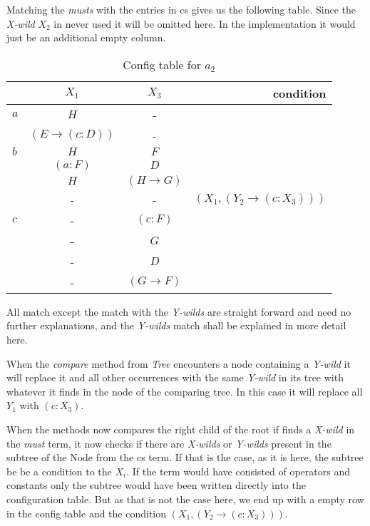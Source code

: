 Matching the \emph{musts} with the entries in cs gives us the following table. Since the \emph{X-wild} $X_2$ in never used it will be omitted here. In the implementation it would just be an additional empty column.

\begin{table}[H]
\centering
\begin{tabular}{l c c r}
		& $X_1$ & $X_3$ & condition \\
	\hline 
	$a$	& $H$ & - &  \\
		& $(E \rightarrow (c:D))$ & - & \\
	\hline
	$b$ & $H$ & $F$ & \\
		& $(a:F)$ & $D$ & \\
		& $H$ & $(H \rightarrow G)$ & \\
		& - & - & $(X_1, (Y_2 \rightarrow (c:X_3)))$\\
	\hline
	$c$	& - & $(c:F)$ & \\
		& - & $G$ & \\
		& - & $D$ & \\
		& - & $(G \rightarrow F)$ &\\
	\hline
\end{tabular}
\caption{Config table for $a_2$}\label{config}
\end{table}

All match except the match with the \emph{Y-wilds} are straight forward and need no further explanations, and the \emph{Y-wilds} match shall be explained in more detail here. 



When the \emph{compare} method from \emph{Tree} encounters a node containing a \emph{Y-wild} it will replace it and all other occurrences with the same \emph{Y-wild} in its tree with whatever it finds in the node of the comparing tree. In this case it will replace all $Y_1$ with $(c:X_3)$. 



When the methods now compares the right child of the root if finds a \emph{X-wild} in the \emph{must} term, it now checks if there are \emph{X-wilds} or \emph{Y-wilds} present in the subtree of the Node from the cs term. If that is the case, as it is here, the subtree be be a condition to the $X_i$. If the term would have consisted of operators and constants only the subtree would have been written directly into the configuration table. But as that is not the case here, we end up with a empty row in the config table and the condition $(X_1, (Y_2 \rightarrow (c:X_3)))$.

